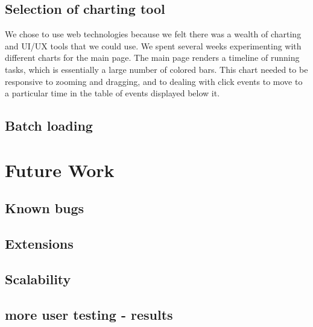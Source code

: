 \documentclass{hmcclinic}
\begin{document}
\section{Selection of charting tool} %
  We chose to use web technologies because we felt there was a wealth of
  charting and UI/UX tools that we could use. We spent several weeks
  experimenting with different charts for the main page. The main page renders a
  timeline of running tasks, which is essentially a large number of colored
  bars. This chart needed to be responsive to zooming and dragging, and to
  dealing with click events to move to a particular time in the table of events
  displayed below it.
\section{Batch loading}

\chapter{Future Work}
\section{Known bugs}
\section{Extensions}
\section{Scalability}
\section{more user testing - results}
\end{document}
